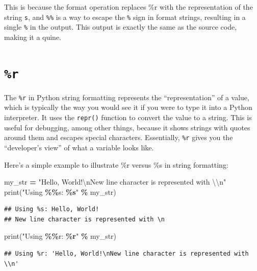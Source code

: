 \documentclass[
]{book}
\newenvironment{Shaded}{\begin{snugshade}}{\end{snugshade}}
\newcommand{\BuiltInTok}[1]{#1}
\newcommand{\CharTok}[1]{\textcolor[rgb]{0.31,0.60,0.02}{#1}}
\newcommand{\NormalTok}[1]{#1}
\newcommand{\OperatorTok}[1]{\textcolor[rgb]{0.81,0.36,0.00}{\textbf{#1}}}
\newcommand{\SpecialCharTok}[1]{\textcolor[rgb]{0.81,0.36,0.00}{\textbf{#1}}}
\newcommand{\StringTok}[1]{\textcolor[rgb]{0.31,0.60,0.02}{#1}}
\theoremstyle{definition}
\theoremstyle{definition}
\theoremstyle{definition}
\theoremstyle{definition}
\theoremstyle{remark}
\begin{document}
This is because the format operation replaces \%r with the representation of the string \texttt{s}, and \texttt{\%\%} is a way to escape the \texttt{\%} sign in format strings, resulting in a single \texttt{\%} in the output. This output is exactly the same as the source code, making it a quine.

\section{\texorpdfstring{\texttt{\%r}}{\%r}}\label{r-1}

The \texttt{\%r} in Python string formatting represents the ``representation'' of a value, which is typically the way you would see it if you were to type it into a Python interpreter. It uses the \texttt{repr()} function to convert the value to a string. This is useful for debugging, among other things, because it shows strings with quotes around them and escapes special characters. Essentially, \texttt{\%r} gives you the ``developer's view'' of what a variable looks like.

Here's a simple example to illustrate \%r versus \%s in string formatting:

\begin{Shaded}
\begin{Highlighting}[]
\NormalTok{my\_str }\OperatorTok{=} \StringTok{"Hello, World!}\CharTok{\textbackslash{}n}\StringTok{New line character is represented with }\CharTok{\textbackslash{}\textbackslash{}}\StringTok{n"}
\BuiltInTok{print}\NormalTok{(}\StringTok{"Using }\SpecialCharTok{\%\%}\StringTok{s: }\SpecialCharTok{\%s}\StringTok{"} \OperatorTok{\%}\NormalTok{ my\_str)}
\end{Highlighting}
\end{Shaded}

\begin{verbatim}
## Using %s: Hello, World!
## New line character is represented with \n
\end{verbatim}

\begin{Shaded}
\begin{Highlighting}[]
\BuiltInTok{print}\NormalTok{(}\StringTok{"Using }\SpecialCharTok{\%\%}\StringTok{r: }\SpecialCharTok{\%r}\StringTok{"} \OperatorTok{\%}\NormalTok{ my\_str)}
\end{Highlighting}
\end{Shaded}

\begin{verbatim}
## Using %r: 'Hello, World!\nNew line character is represented with \\n'
\end{verbatim}
\end{document}
